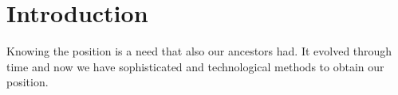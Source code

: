 \section{Introduction}
\label{sec:intro}

Knowing the position is a need that also our ancestors had. It evolved through time and now we have sophisticated and technological methods to obtain our position.



